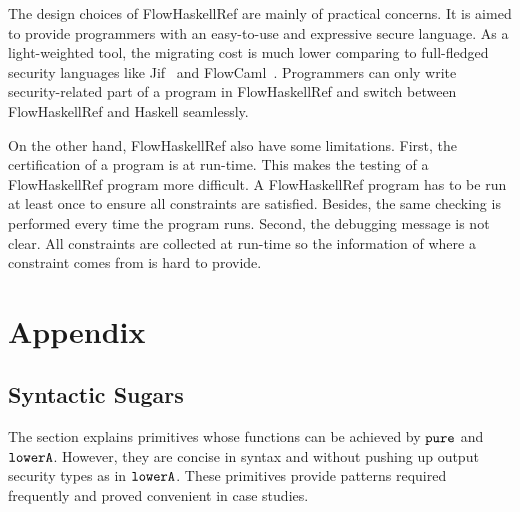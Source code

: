 \documentclass[a4paper]{report}
\newcommand{\co}[1]{$\cod{#1}$}
\begin{document}
The design choices of FlowHaskellRef are mainly of practical concerns. 
It is aimed to provide programmers with an easy-to-use and expressive secure language.
As a light-weighted tool, the migrating cost is much lower comparing to full-fledged security languages
like Jif~\cite{jif} and FlowCaml~\cite{FlowCaml}.
Programmers can only write security-related part of a program in FlowHaskellRef and switch between 
FlowHaskellRef and Haskell seamlessly.

On the other hand, FlowHaskellRef also have some limitations. First, the certification of a program is at
run-time. This makes the testing of a FlowHaskellRef program more difficult. A FlowHaskellRef program has to be 
run at least once to ensure all constraints are satisfied. Besides, the same checking is performed every time
the program runs. Second, the debugging message is not clear. All constraints are collected at run-time so
the information of where a constraint comes from is hard to provide.









\chapter*{Appendix}

\setcounter{section}{0}
\renewcommand\thesection{\Alph{section}}

\section{Syntactic Sugars}
The section explains primitives whose functions can be achieved by
\co{pure} and \co{lowerA}. However, they are concise in syntax and
without pushing up output security types as in \co{lowerA}.
These primitives provide patterns required frequently and proved convenient in case studies.
\end{document}
